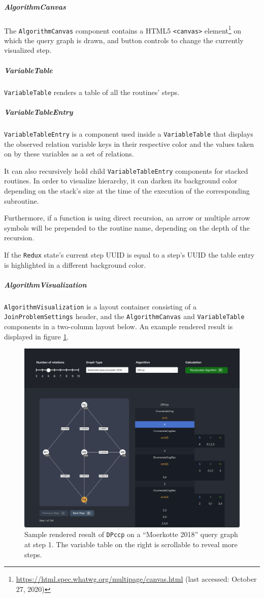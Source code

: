 \subparagraph{AlgorithmCanvas}
The \texttt{AlgorithmCanvas} component contains a HTML5 \texttt{<canvas>} element\footnote{\url{https://html.spec.whatwg.org/multipage/canvas.html} (last accessed: October 27, 2020)} on which the query graph is drawn, and button controls to change the currently visualized step. 

\subparagraph{VariableTable}
\texttt{VariableTable} renders a table of all the routines' steps.

\subparagraph{VariableTableEntry}
\texttt{VariableTableEntry} is a component used inside a \texttt{VariableTable} that displays the observed relation variable keys in their respective color and the values taken on by these variables as a set of relations.

It can also recursively hold child \texttt{VariableTableEntry} components for stacked routines. 
In order to visualize hierarchy, it can darken its background color depending on the stack's size at the time of the execution of the corresponding subroutine.

Furthermore, if a function is using direct recursion, an arrow or multiple arrow symbols will be prepended to the routine name, depending on the depth of the recursion.

If the \texttt{Redux} state's current step UUID is equal to a step's UUID the table entry is highlighted in a different background color.

\subparagraph{AlgorithmVisualization} 
\texttt{AlgorithmVisualization} is a layout container consisting of a \texttt{JoinProblemSettings} header, and the \texttt{AlgorithmCanvas} and \texttt{VariableTable} components in a two-column layout below. An example rendered result is displayed in figure \ref{fig:sample-rendered-dpccp}.

\begin{figure}[H]
    \includegraphics[width=\textwidth + 2cm]{img/renderedVisualization.png}
    \caption[Sample rendered result of \texttt{DPccp} on a ``Moerkotte 2018'' query graph at step 1]{Sample rendered result of \texttt{DPccp} on a ``Moerkotte 2018'' query graph at step 1. The variable table on the right is scrollable to reveal more steps.}
    \label{fig:sample-rendered-dpccp}
\end{figure}

